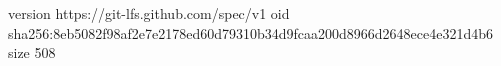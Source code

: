 version https://git-lfs.github.com/spec/v1
oid sha256:8eb5082f98af2e7e2178ed60d79310b34d9fcaa200d8966d2648ece4e321d4b6
size 508
